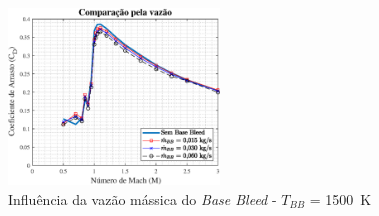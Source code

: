\begin{figure}[!ht]
	\centering
	\includegraphics[width=0.5\textwidth]{cd-combasebleed-1500K-2pol.eps}
	\caption{Influência da vazão mássica do \textit{Base Bleed} - \(T_{BB}\) = \qty{1500}{\kelvin}}
	\label{fig:comparacao-basebleed-vazao}
\end{figure}

